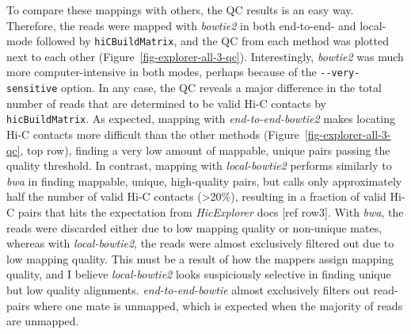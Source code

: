 \documentclass[
  11pt,
  a4paper,
]{scrbook}
\let\oldemph\emph
\renewcommand\emph[1]{\oldemph{\color{gray}#1}}
\begin{document}
To compare these mappings with others, the QC results is an easy way.
Therefore, the reads were mapped with \emph{bowtie2} in both end-to-end-
and local-mode followed by \texttt{hiCBuildMatrix}, and the QC from each
method was plotted next to each other
(Figure~\ref{fig-explorer-all-3-qc}). Interestingly, \emph{bowtie2} was
much more computer-intensive in both modes, perhaps because of the
\texttt{-\/-very-sensitive} option. In any case, the QC reveals a major
difference in the total number of reads that are determined to be valid
Hi-C contacts by \texttt{hicBuildMatrix}. As expected, mapping with
\emph{end-to-end-bowtie2} makes locating Hi-C contacts more difficult
than the other methods (Figure~\ref{fig-explorer-all-3-qc}, top row),
finding a very low amount of mappable, unique pairs passing the quality
threshold. In contrast, mapping with \emph{local-bowtie2} performs
similarly to \emph{bwa} in finding mappable, unique, high-quality pairs,
but calls only approximately half the number of valid Hi-C contacts
(\textgreater20\%), resulting in a fraction of valid Hi-C pairs that
hits the expectation from \emph{HicExplorer} docs {[}ref row3{]}. With
\emph{bwa}, the reads were discarded either due to low mapping quality
or non-unique mates, whereas with \emph{local-bowtie2}, the reads were
almost exclusively filtered out due to low mapping quality. This must be
a result of how the mappers assign mapping quality, and I believe
\emph{local-bowtie2} looks suspiciously selective in finding unique but
low quality alignments. \emph{end-to-end-bowtie} almost exclusively
filters out read-pairs where one mate is unmapped, which is expected
when the majority of reads are unmapped.
\end{document}
